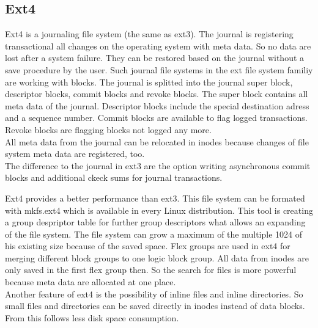 \subsection{Ext4}

Ext4 is a journaling file system (the same as ext3). The journal is registering transactional all changes on the operating system with meta data.
So no data  are lost after a system failure. They can be restored based on the journal without a save procedure by the user.
Such journal file systems in the ext file system familiy are working with blocks\cite[~p.20]{Seufert2015}.
The journal is splitted into the journal super block, descriptor blocks, commit blocks and revoke blocks.
The super block contains all meta data of the journal. Descriptor blocks include the special destination adress and a sequence number. 
Commit blocks are available to flag logged transactions.
Revoke blocks are flagging blocks not logged any more. \\
All meta data from the journal can be relocated in inodes because changes of file system meta data are registered, too. \\
The difference to the journal in ext3 are the option writing asynchronous commit blocks and additional ckeck sums for journal transactions\cite[~p.28]{Seufert2015}.

Ext4 provides a better performance than ext3. 
This file system can be formated with mkfs.ext4 which is available in every Linux distribution.
This tool is creating a group despriptor table for further group descriptors what allows an expanding of the file system. The file system can grow a maximum of the multiple 1024 of his existing size because of the saved space\cite[~p.21]{Seufert2015}.
Flex groups are used in ext4 for merging different block groups to one logic block group. All data from inodes are only saved in the first flex group then. 
So the search for files is more powerful because meta data are allocated at one place. \\

Another feature of ext4 is the possibility of inline files and inline directories. So small files and directories can be saved directly in inodes instead of data blocks. From this follows less disk space consumption\cite[p.24]{Seufert2015}.

